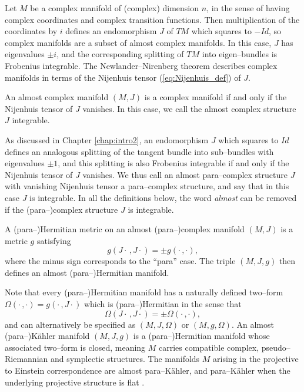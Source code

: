 Let $M$ be a complex manifold of (complex) dimension $n$, in the sense of having complex coordinates and complex transition functions. Then multiplication of the coordinates by $i$ defines an endomorphism $J$ of $TM$ which squares to $-Id$, so complex manifolds are a subset of almost complex manifolds. In this case, $J$ has eigenvalues $\pm i$, and the corresponding splitting of $TM$ into eigen--bundles is Frobenius integrable. The Newlander--Nirenberg theorem describes complex manifolds in terms of the Nijenhuis tensor (\ref{eq:Nijenhuis_def}) of $J$.

\begin{theo}
An almost complex manifold $(M,J)$ is a complex manifold if and only if the Nijenhuis tensor of $J$ vanishes. In this case, we call the almost complex structure $J$ integrable.
\end{theo}


As discussed in Chapter \ref{chap:intro2}, an endomorphism $J$ which squares to $Id$ defines an analogous splitting of the tangent bundle into sub--bundles with eigenvalues $\pm 1$, and this splitting is also Frobenius integrable if and only if the Nijenhuis tensor of $J$ vanishes. We thus call an almost para--complex structure $J$ with vanishing Nijenhuis tensor a para--complex structure, and say that in this case $J$ is integrable. In all the definitions below, the word \textit{almost} can be removed if the (para--)complex structure $J$ is integrable.

\begin{defi}
A (para--)Hermitian metric on an almost (para--)complex manifold $(M,J)$ is a metric $g$ satisfying
\[
g(J\cdot\,,J\cdot) = \pm g(\cdot\,,\cdot),
\]
where the minus sign corresponds to the ``para'' case. The triple $(M,J,g)$ then defines an almost (para--)Hermitian manifold.
\end{defi}

Note that every (para--)Hermitian manifold has a naturally defined two--form $\Omega(\cdot\,,\cdot)=g(\cdot\,,J\cdot)$ which is (para--)Hermitian in the sense that
\[
\Omega(J\cdot\,,J\cdot) = \pm \Omega(\cdot\,,\cdot),
\]
and can alternatively be specified as $(M,J,\Omega)$ or $(M,g,\Omega)$. An almost (para--)K\"ahler manifold $(M,J,g)$ is a (para--)Hermitian manifold whose associated two--form is closed, meaning $M$ carries compatible complex, pseudo--Riemannian and symplectic structures. The manifolds $M$ arising in the projective to Einstein correspondence are almost para--K\"ahler, and para--K\"ahler when the underlying projective structure is flat \cite{DM}.

